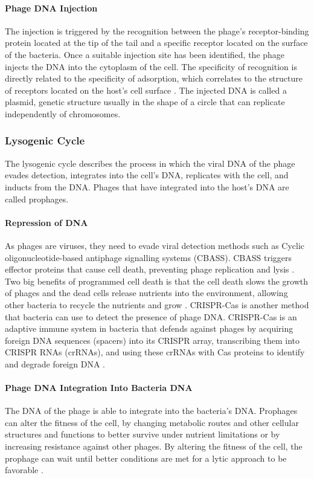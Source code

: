 \paragraph{Phage DNA Injection}
The injection is triggered by the recognition between the phage's receptor-binding protein located at the tip of the tail and a specific receptor located on the surface of the bacteria. 
Once a suitable injection site has been identified, the phage injects the DNA into the cytoplasm of the cell. 
The specificity of recognition is directly related to the specificity of adsorption, which correlates to the structure of receptors located on the host's cell surface \cite{stoneUnderstandingExploitingPhage2019}. 
The injected DNA is called a plasmid, genetic structure usually in the shape of a circle that can replicate independently of chromosomes. 

\subsubsection{Lysogenic Cycle}
The lysogenic cycle describes the process in which the viral DNA of the phage evades detection, integrates into the cell's DNA, replicates with the cell, and inducts from the DNA. 
Phages that have integrated into the host's DNA are called prophages. 
\paragraph{Repression of DNA}
As phages are viruses, they need to evade viral detection methods such as Cyclic oligonucleotide-based antiphage signalling systems (CBASS). 
CBASS triggers effector proteins that cause cell death, preventing phage replication and lysis \cite{banhBacterialCGASSenses2023}. 
Two big benefits of programmed cell death is that the cell death slows the growth of phages and the dead cells release nutrients into the environment, allowing other bacteria to recycle the nutrients and grow \cite{warwick-dugdaleHosthijackingPlanktonicPiracy2019}. \newline
CRISPR-Cas is another method that bacteria can use to detect the presence of phage DNA. 
CRISPR-Cas is an adaptive immune system in bacteria that defends against phages by acquiring foreign DNA sequences (spacers) into its CRISPR array, transcribing them into CRISPR RNAs (crRNAs), and using these crRNAs with Cas proteins to identify and degrade foreign DNA \cite{levyCRISPRAdaptationBiases2015}. 
\paragraph{Phage DNA Integration Into Bacteria DNA}
The DNA of the phage is able to integrate into the bacteria's DNA. 
Prophages can alter the fitness of the cell, by changing metabolic routes and other cellular structures and functions to better survive under nutrient limitations or by increasing resistance against other phages. 
By altering the fitness of the cell, the prophage can wait until better conditions are met for a lytic approach to be favorable \cite{warwick-dugdaleHosthijackingPlanktonicPiracy2019}. 
